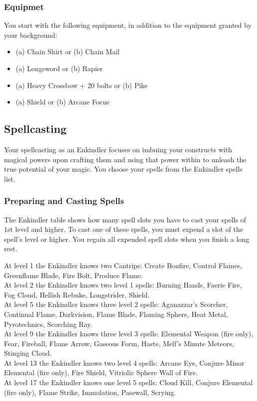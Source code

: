 \subsubsection{Equipmet}
You start with the following equipment, in addition to the equipment granted by your background:
\begin{itemize}
\item (a) Chain Shirt or (b) Chain Mail
\item (a) Longsword or (b) Rapier
\item (a) Heavy Crossbow + 20 bolts or (b) Pike 
\item (a) Shield or (b) Arcane Focus
\end{itemize}

\subsection{Spellcasting}

Your spellcasting as an Enkindler focuses on imbuing your constructs with magical powers upon crafting them and using that power within to unleash the true potential of your magic. You choose your spells from the Enkindler spells list.

\subsubsection{Preparing and Casting Spells}

The Enkindler table shows how many spell slots you have to cast your spells of 1st level and higher. To cast one of these spells, you must expend a slot of the spell’s level or higher. You regain all expended spell slots when you finish a long rest.

At level 1 the Enkindler knows two Cantrips: Create Bonfire, Control Flames, Greenflame Blade, Fire Bolt, Produce Flame.\\
At level 2 the Enkindler knows two level 1 spells: Burning Hands, Faerie Fire, Fog Cloud, Hellish Rebuke, Longstrider, Shield.\\
At level 5 the Enkindler knows three level 2 spells: Aganazzar's Scorcher, Continual Flame, Darkvision, Flame Blade, Flaming Sphere, Heat Metal, Pyrotechnics, Scorching Ray.\\
At level 9 the Enkindler knows three level 3 spells: Elemental Weapon (fire only), Fear, Fireball, Flame Arrow, Gaseous Form, Haste, Melf's Minute Meteors, Stinging Cloud.\\
At level 13 the Enkindler knows two level 4 spells: Arcane Eye, Conjure Minor Elemental (fire only), Fire Shield, Vitriolic Sphere Wall of Fire.\\
At level 17 the Enkindler knows one level 5 spells: Cloud Kill, Conjure Elemental (fire only), Flame Strike, Immolation, Passwall, Scrying.\\

